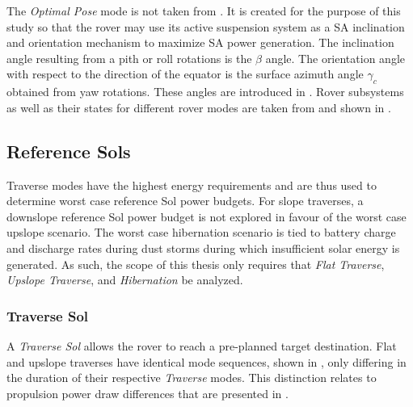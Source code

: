 The \textit{Optimal Pose} mode is not taken from . It is created for the purpose of this study so that the rover may use its active suspension system as a \ac{SA} inclination and orientation mechanism to maximize \ac{SA} power generation. The inclination angle resulting from a pith or roll rotations is  the $\beta$ angle. The orientation angle with respect to the direction of the equator is the surface azimuth angle $\gamma_{c}$ obtained from yaw rotations. These angles are introduced in . Rover subsystems as well as their states for different rover modes are taken from  and shown in .



\subsection{Reference Sols}
\label{sec:ReferenceSols:ReferenceSols}
Traverse modes have the highest energy requirements and are thus used to determine worst case reference Sol power budgets. For slope traverses, a downslope reference Sol power budget is not explored in favour of the worst case upslope scenario. The worst case hibernation scenario is tied to battery charge and discharge rates during dust storms during which insufficient solar energy is generated. As such, the scope of this thesis only requires that \textit{Flat Traverse}, \textit{Upslope Traverse}, and \textit{Hibernation} be analyzed.


\subsubsection{Traverse Sol}
\label{sec:ReferenceSols:TraverseSol}
A \textit{Traverse Sol} allows the rover to reach a pre-planned target destination. Flat and upslope traverses have identical mode sequences, shown in , only differing in the duration of their respective \textit{Traverse} modes. This distinction relates to propulsion power draw differences that are presented in .



